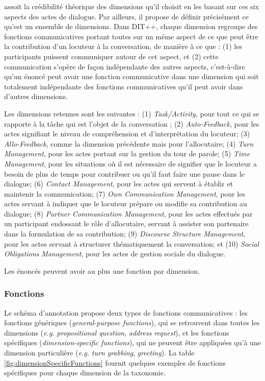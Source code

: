 \documentclass[10pt,a4paper,twoside]{article}
\begin{document}
\citeauthor{bunt2009dit++} assoit la crédibilité théorique des dimensions qu'il choisit en les basant sur ces six aspects des actes de dialogue. Par ailleurs, il propose de définir précisément ce qu'est un ensemble de dimensions. Dans DIT++, chaque dimension regroupe des fonctions communicatives portant toutes sur un même aspect de ce que peut être la contribution d'un locuteur à la conversation, de manière à ce que : (1) les participants puissent communiquer autour de cet aspect, et (2) cette communication s'opère de façon indépendante des autres aspects, c'est-à-dire qu'un énoncé peut avoir une fonction communicative dans une dimension qui soit totalement indépendante des fonctions communicatives qu'il peut avoir dans d'autres dimensions.

Les dimensions retenues sont les suivantes : (1) \textit{Task/Activity}, pour tout ce qui se rapporte à la tâche qui est l'objet de la conversation ; (2) \textit{Auto-Feedback}, pour les actes signifiant le niveau de compréhension et d'interprétation du locuteur; (3) \textit{Allo-Feedback}, comme la dimension précédente mais pour l'allocutaire; (4) \textit{Turn Management}, pour les actes portant sur la gestion du tour de parole; (5) \textit{Time Management}, pour les situations où il est nécessaire de signifier que le locuteur a besoin de plus de temps pour contribuer ou qu'il faut faire une pause dans le dialogue; (6) \textit{Contact Management}, pour les actes qui servent à établir et maintenir la communication; (7) \textit{Own Communication Management}, pour les actes servant à indiquer que le locuteur prépare ou modifie sa contribution au dialogue; (8) \textit{Partner Communication Management}, pour les actes effectués par un participant endossant le rôle d'allocutaire, servant à assister son partenaire dans la formulation de sa contribution; (9) \textit{Discourse Structure Management}, pour les actes servant à structurer thématiquement la conversation; et (10) \textit{Social Obligations Management}, pour les actes de gestion sociale du dialogue.

Les énoncés peuvent avoir au plus une fonction par dimension.

\subsubsection{Fonctions}

Le schéma d'annotation propose deux types de fonctions communicatives : les fonctions génériques (\textit{general-purpose functions}), qui se retrouvent dans toutes les dimensions (\textit{e.g.} \textit{propositional question}, \textit{address request}), et les fonctions spécifiques (\textit{dimension-specific functions}), qui ne peuvent être appliquées qu'à une dimension particulière (\textit{e.g.} \textit{turn grabbing}, \textit{greeting}). La table \ref{fig:dimensionSpecificFunctions} fournit quelques exemples de fonctions spécifiques pour chaque dimension de la taxonomie.
\end{document}
